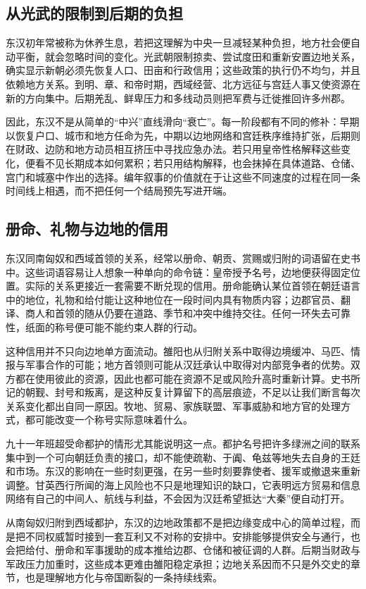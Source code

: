 \subsection{从光武的限制到后期的负担}

东汉初年常被称为休养生息，若把这理解为中央一旦减轻某种负担，地方社会便自动平衡，就会忽略时间的变化。光武朝限制掠卖、尝试度田和重新安置边地关系，确实显示新朝必须先恢复人口、田亩和行政信用；这些政策的执行仍不均匀，并且依赖地方关系。到明、章、和帝时期，西域经营、北方远征与宫廷人事又使资源在新的方向集中。后期羌乱、鲜卑压力和多线动员则把军费与迁徙推回许多州郡。

因此，东汉不是从简单的“中兴”直线滑向“衰亡”。每一阶段都有不同的修补：早期以恢复户口、城市和地方任命为先，中期以边地网络和宫廷秩序维持扩张，后期则在财政、边防和地方动员相互挤压中寻找应急办法。若只用皇帝性格解释这些变化，便看不见长期成本如何累积；若只用结构解释，也会抹掉在具体道路、仓储、宫门和城塞中作出的选择。编年叙事的价值就在于让这些不同速度的过程在同一条时间线上相遇，而不把任何一个结局预先写进开端。

\subsection{册命、礼物与边地的信用}

东汉同南匈奴和西域首领的关系，经常以册命、朝贡、赏赐或归附的词语留在史书中。这些词语容易让人想象一种单向的命令链：皇帝授予名号，边地便获得固定位置。实际的关系更接近一套需要不断兑现的信用。册命能确认某位首领在朝廷语言中的地位，礼物和给付能让这种地位在一段时间内具有物质内容；边郡官员、翻译、商人和首领的随从仍要在道路、季节和冲突中维持交往。任何一环失去可靠性，纸面的称号便可能不能约束人群的行动。

这种信用并不只向边地单方面流动。雒阳也从归附关系中取得边境缓冲、马匹、情报与军事合作的可能；地方首领则可能从汉廷承认中取得对内部竞争者的优势。双方都在使用彼此的资源，因此也都可能在资源不足或风险升高时重新计算。史书所记的朝觐、封号和叛离，是这种反复计算留下的高层痕迹，不足以让我们断言每次关系变化都出自同一原因。牧地、贸易、家族联盟、军事威胁和地方官的处理方式，都可能改变一个称号实际意味着什么。

九十一年班超受命都护的情形尤其能说明这一点。都护名号把许多绿洲之间的联系集中到一个可向朝廷负责的接口，却不能使疏勒、于阗、龟兹等地失去自身的王廷和市场。东汉的影响在一些时刻更强，在另一些时刻要靠使者、援军或撤退来重新调整。甘英西行所闻的海上风险也不只是地理知识的缺口，它表明远方贸易和信息网络有自己的中间人、航线与利益，不会因为汉廷希望抵达“大秦”便自动打开。

从南匈奴归附到西域都护，东汉的边地政策都不是把边缘变成中心的简单过程，而是把不同权威暂时接到一套互利又不对称的安排中。安排能够提供安全与通行，也会把给付、册命和军事援助的成本推给边郡、仓储和被征调的人群。后期当财政与军政压力加重时，这些成本更难由雒阳稳定承担；边地关系因而不只是外交史的章节，也是理解地方化与帝国断裂的一条持续线索。

